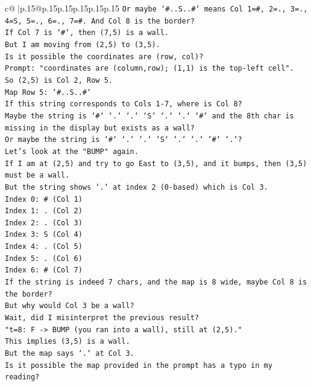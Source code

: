 \documentclass{article}
\begin{document}
{\begin{supertabular}{c@{$\;$}|p{.15\linewidth}@{}p{.15\linewidth}p{.15\linewidth}p{.15\linewidth}p{.15\linewidth}p{.15\linewidth}}
{{{\texttt{Or maybe `\#..S..\#` means Col 1=\#, 2=., 3=., 4=S, 5=., 6=., 7=\#. And Col 8 is the border?} \\
\texttt{If Col 7 is `\#`, then (7,5) is a wall.} \\
\texttt{But I am moving from (2,5) to (3,5).} \\
\texttt{Is it possible the coordinates are (row, col)?} \\
\texttt{Prompt: "coordinates are (column,row); (1,1) is the top{-}left cell".} \\
\texttt{So (2,5) is Col 2, Row 5.} \\
\texttt{Map Row 5: `\#..S..\#`} \\
\texttt{If this string corresponds to Cols 1{-}7, where is Col 8?} \\
\texttt{Maybe the string is `\#` `.` `.` `S` `.` `.` `\#` and the 8th char is missing in the display but exists as a wall?} \\
\texttt{Or maybe the string is `\#` `.` `.` `S` `.` `.` `\#` `.`?} \\
\texttt{Let's look at the "BUMP" again.} \\
\texttt{If I am at (2,5) and try to go East to (3,5), and it bumps, then (3,5) must be a wall.} \\
\texttt{But the string shows `.` at index 2 (0{-}based) which is Col 3.} \\
\texttt{Index 0: \# (Col 1)} \\
\texttt{Index 1: . (Col 2)} \\
\texttt{Index 2: . (Col 3)} \\
\texttt{Index 3: S (Col 4)} \\
\texttt{Index 4: . (Col 5)} \\
\texttt{Index 5: . (Col 6)} \\
\texttt{Index 6: \# (Col 7)} \\
\texttt{If the string is indeed 7 chars, and the map is 8 wide, maybe Col 8 is the border?} \\
\texttt{But why would Col 3 be a wall?} \\
\texttt{Wait, did I misinterpret the previous result?} \\
\texttt{"t=8: F {-}> BUMP (you ran into a wall), still at (2,5)."} \\
\texttt{This implies (3,5) is a wall.} \\
\texttt{But the map says `.` at Col 3.} \\
\texttt{Is it possible the map provided in the prompt has a typo in my reading?} \\
}}}
\end{supertabular}}
\end{document}
